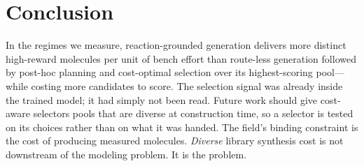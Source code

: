 \documentclass{article}
\newcommand{\checkval}[1]{#1}
\begin{document}


\section{Conclusion}

In the regimes we measure, reaction-grounded generation delivers more distinct high-reward molecules per unit of bench effort than route-less generation followed by post-hoc planning and cost-optimal selection over its highest-scoring pool---while costing more candidates to score. The selection signal was already inside the trained model; it had simply not been read. Future work should give cost-aware selectors pools that are diverse at construction time, so a selector is tested on its choices rather than on what it was handed. The field's binding constraint is the cost of producing measured molecules. \emph{Diverse} library synthesis cost is not downstream of the modeling problem. It is the problem.
\end{document}

